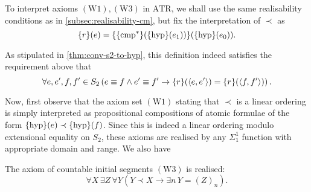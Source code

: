 \documentclass[11pt]{article}
\theoremstyle{plain}
\theoremstyle{definition}
\newcommand{\tuple}[1]{\left\langle #1 \right\rangle}
\begin{document}
To interpret axioms $\left(\mathrm{W}1\right), \left(\mathrm{W}3\right)$ in $\mathrm{ATR}$, we shall use the same realisability conditions as in \autoref{subsec:realisability-cm}, but fix the interpretation of $\prec$ as
\[\mleft\{r\mright\}\mleft(e\mright) = \mleft\{\mleft\{\mathrm{cmp}^*\mright\}\mleft(\mleft\{\mathrm{hyp}\mright\}\mleft(e_1\mright)\mright)\mright\}\mleft(\mleft\{\mathrm{hyp}\mright\}\mleft(e_0\mright)\mright).\]

As stipulated in \autoref{thm:conv-s2-to-hyp}, this definition indeed satisfies the requirement above that
\[\forall e, e', f, f' \in S_2 \left(e \equiv f \land e' \equiv f' \rightarrow \mleft\{r\mright\}\mleft(\tuple{e, e'}\mright) = \mleft\{r\mright\}\mleft(\tuple{f, f'}\mright)\right).\]

Now, first observe that the axiom set $\left(\mathrm{W}1\right)$ stating that $\prec$ is a linear ordering is simply interpreted as propositional compositions of atomic formulae of the form $\mleft\{\mathrm{hyp}\mright\}\mleft(e\mright) \prec \mleft\{\mathrm{hyp}\mright\}\mleft(f\mright)$. Since this is indeed a linear ordering modulo extensional equality on $S_2$, these axioms are realised by any $\Sigma^1_1$ function with appropriate domain and range. We also have

\begin{proposition}
    The axiom of countable initial segments $\left(\mathrm{W}3\right)$ is realised:
    \[\forall X \, \exists Z \, \forall Y \left(Y \prec X \rightarrow \exists n \, Y = \left(Z\right)_n\right).\]
\end{proposition}
\end{document}
